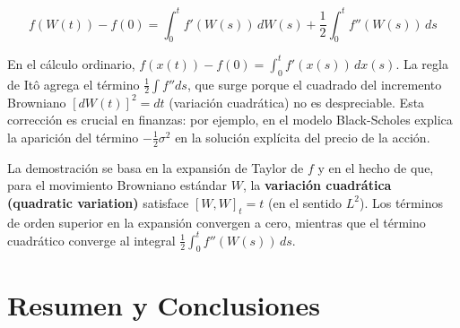 \documentclass[12pt]{article}
\begin{document}
\begin{equation}
  f(W(t)) - f(0) = \int_0^t f'(W(s))\,dW(s) + \frac{1}{2}\int_0^t f''(W(s))\,ds
  \tag{3.52}
\end{equation}

\begin{intuicionmat}
En el c\'alculo ordinario, $f(x(t)) - f(0) = \int_0^t f'(x(s))\,dx(s)$. La regla de It\^o agrega el t\'ermino $\frac{1}{2}\int f'' ds$, que surge porque el cuadrado del incremento Browniano $[dW(t)]^2 = dt$ (variaci\'on cuadr\'atica) no es despreciable. Esta correcci\'on es crucial en finanzas: por ejemplo, en el modelo Black-Scholes explica la aparici\'on del t\'ermino $-\frac{1}{2}\sigma^2$ en la soluci\'on expl\'icita del precio de la acci\'on.
\end{intuicionmat}

La demostraci\'on se basa en la expansi\'on de Taylor de $f$ y en el hecho de que, para el movimiento Browniano est\'andar $W$, la \textbf{variaci\'on cuadr\'atica (quadratic variation)} satisface $[W,W]_t = t$ (en el sentido $L^2$). Los t\'erminos de orden superior en la expansi\'on convergen a cero, mientras que el t\'ermino cuadr\'atico converge al integral $\frac{1}{2}\int_0^t f''(W(s))\,ds$.

\section{Resumen y Conclusiones}
\end{document}
